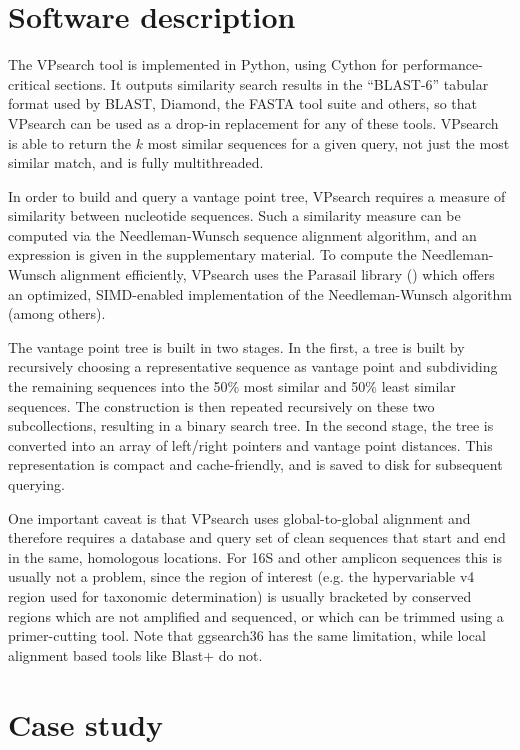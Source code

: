 \documentclass{bioinfo}
\begin{document}
\section{Software description}

The VPsearch tool is implemented in Python, using Cython for performance-critical sections.
It outputs similarity search results in the ``BLAST-6''
tabular format used by BLAST, Diamond, the FASTA tool suite and others, so that
VPsearch can be used as a drop-in replacement for any of these tools. VPsearch
is able to return the $k$ most similar sequences for a given query, not just
the most similar match, and is fully multithreaded.

In order to build and query a vantage point tree, VPsearch requires a measure
of similarity between nucleotide sequences. Such a similarity measure can be
computed via the Needleman-Wunsch sequence alignment algorithm, and an
expression is given in the supplementary material. To compute the
Needleman-Wunsch alignment efficiently, VPsearch uses the Parasail library
(\cite{2016-daily-ParasailSIMDLibrary}) which offers an optimized, SIMD-enabled
implementation of the Needleman-Wunsch algorithm (among others).

The vantage point tree is built in two stages. In the first, a tree is built by
recursively choosing a representative sequence as vantage point and subdividing
the remaining sequences into the 50\% most similar and 50\% least similar
sequences. The construction is then repeated recursively on these two
subcollections, resulting in a binary search tree. In the second stage, the
tree is converted into an array of left/right pointers and vantage point
distances. This representation is compact and cache-friendly, and is saved to disk for
subsequent querying.

One important caveat is that VPsearch uses global-to-global alignment and
therefore requires a database and query set of clean sequences that start and
end in the same, homologous locations. For 16S and other amplicon sequences
this is usually not a problem, since the region of interest (e.g. the
hypervariable v4 region used for taxonomic determination) is usually bracketed
by conserved regions which are not amplified and sequenced, or which can be
trimmed using a primer-cutting tool. Note that ggsearch36 has the same
limitation, while local alignment based tools like Blast+ do not.

\vspace*{-0.5cm}
\section{Case study}
\end{document}

